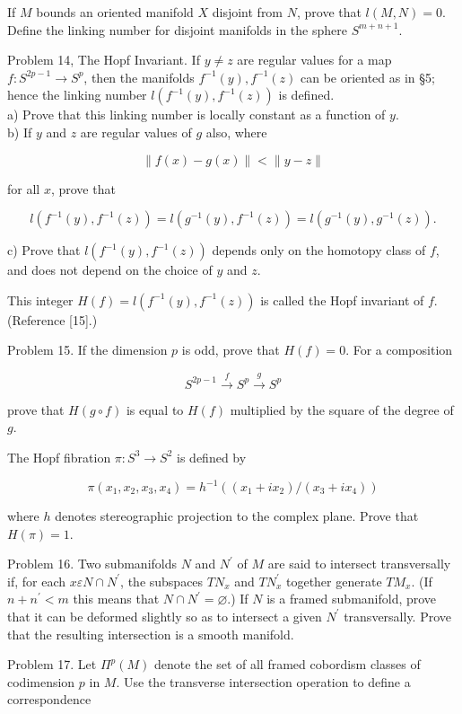 \documentclass[10pt, letterpaper]{article}
\begin{document}
If $M$ bounds an oriented manifold $X$ disjoint from $N$, prove that $l(M, N)=0$. Define the linking number for disjoint manifolds in the sphere $S^{m+n+1}$.

Problem 14, The Hopf Invariant. If $y \neq z$ are regular values for a map $f: S^{2 p-1} \rightarrow S^{p}$, then the manifolds $f^{-1}(y), f^{-1}(z)$ can be oriented as in §5; hence the linking number $l\left(f^{-1}(y), f^{-1}(z)\right)$ is defined.\\
a) Prove that this linking number is locally constant as a function of $y$.\\
b) If $y$ and $z$ are regular values of $g$ also, where

$$
\|f(x)-g(x)\|<\|y-z\|
$$

for all $x$, prove that

$$
l\left(f^{-1}(y), f^{-1}(z)\right)=l\left(g^{-1}(y), f^{-1}(z)\right)=l\left(g^{-1}(y), g^{-1}(z)\right) .
$$

c) Prove that $l\left(f^{-1}(y), f^{-1}(z)\right)$ depends only on the homotopy class of $f$, and does not depend on the choice of $y$ and $z$.

This integer $H(f)=l\left(f^{-1}(y), f^{-1}(z)\right)$ is called the Hopf invariant of $f$. (Reference [15].)

Problem 15. If the dimension $p$ is odd, prove that $H(f)=0$. For a composition

$$
S^{2 p-1} \xrightarrow{f} S^{p} \xrightarrow{g} S^{p}
$$

prove that $H(g \circ f)$ is equal to $H(f)$ multiplied by the square of the degree of $g$.

The Hopf fibration $\pi: S^{3} \rightarrow S^{2}$ is defined by

$$
\pi\left(x_{1}, x_{2}, x_{3}, x_{4}\right)=h^{-1}\left(\left(x_{1}+i x_{2}\right) /\left(x_{3}+i x_{4}\right)\right)
$$

where $h$ denotes stereographic projection to the complex plane. Prove that $H(\pi)=1$.

Problem 16. Two submanifolds $N$ and $N^{\prime}$ of $M$ are said to intersect transversally if, for each $x \varepsilon N \cap N^{\prime}$, the subspaces $T N_{x}$ and $T N_{x}^{\prime}$ together generate $T M_{x}$. (If $n+n^{\prime}<m$ this means that $N \cap N^{\prime}=\varnothing$.) If $N$ is a framed submanifold, prove that it can be deformed slightly so as to intersect a given $N^{\prime}$ transversally. Prove that the resulting intersection is a smooth manifold.

Problem 17. Let $\Pi^{p}(M)$ denote the set of all framed cobordism classes of codimension $p$ in $M$. Use the transverse intersection operation to define a correspondence
\end{document}
